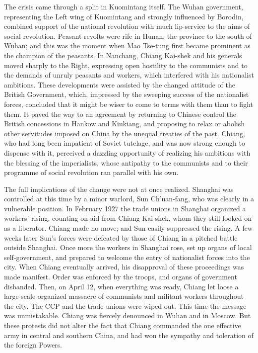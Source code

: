 The crisis came through a split in Kuomintang itself. The Wuhan government, representing the Left wing of Kuomintang and strongly influenced by Borodin, combined support of the national revolution with much lip-service to the aims of social revolution. Peasant revolts were rife in Hunan, the province to the south of Wuhan; and this was the moment when Mao Tse-tung first became prominent as the champion of the peasants. In Nanchang, Chiang Kai-shek and his generals moved sharply to the Right, expressing open hostility to the communists and to the demands of unruly peasants and workers, which interfered with his nationalist ambitions. These developments were assisted by the changed attitude of the British Government, which, impressed by the sweeping success of the nationalist forces, concluded that it might be wiser to come to terms with them than to fight them. It paved the way to an agreement by returning to Chinese control the British concessions in Hankow and Kiukiang, and proposing to relax or abolish other servitudes imposed on China by the unequal treaties of the past. Chiang, who had long been impatient of Soviet tutelage, and was now strong enough to dispense with it, perceived a dazzling opportunity of realizing his ambitions with the blessing of the imperialists, whose antipathy to the communists and to their programme of social revolution ran parallel with his own. 

The full implications of the change were not at once realized. Shanghai was controlled at this time by a minor warlord, Sun Ch'uan-fang, who was clearly in a vulnerable position. In February 1927 the trade unions in Shanghai organized a workers' rising, counting on aid from Chiang Kai-shek, whom they still looked on as a liberator. Chiang made no move; and Sun easily suppressed the rising. A few weeks later Sun's forces were defeated by those of Chiang in a pitched battle outside Shanghai. Once more the workers in Shanghai rose, set up organs of local self-government, and prepared to welcome the entry of nationalist forces into the city. When Chiang eventually arrived, his disapproval of these proceedings was made manifest. Order was enforced by the troops, and organs of government disbanded. Then, on April 12, when everything was ready, Chiang let loose a large-scale organized massacre of communists and militant workers throughout the city. The CCP and the trade unions were wiped out. This time the message was unmistakable. Chiang was fiercely denounced in Wuhan and in Moscow. But these protests did not alter the fact that Chiang commanded the one effective army in central and southern China, and had won the sympathy and toleration of the foreign Powers. 

